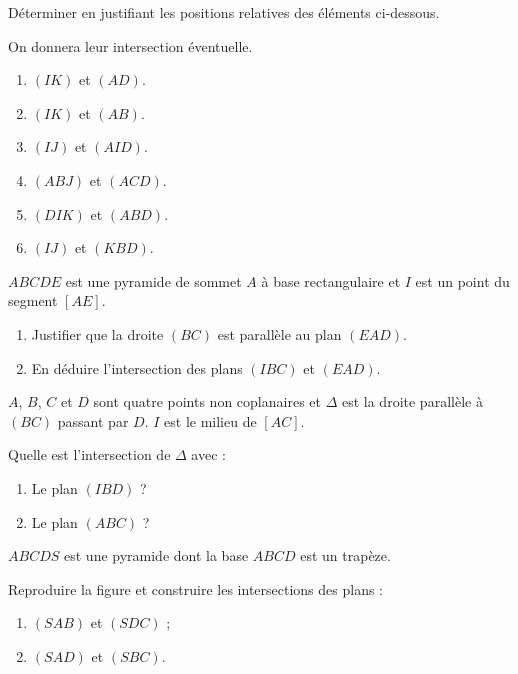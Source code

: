 \documentclass{cornouaille}
\begin{document}
\begin{colonne*exercice}
\begin{exercice}
  Déterminer en justifiant les positions relatives des éléments
  ci-dessous. 

  On donnera leur intersection éventuelle.
  \begin{enumerate}
  \item $(IK)$ et $(AD)$.
  \item $(IK)$ et $(AB)$.
  \item $(IJ)$ et $(AID)$.
  \item $(ABJ)$ et $(ACD)$.
  \item $(DIK)$ et $(ABD)$.
  \item $(IJ)$ et $(KBD)$.
  \end{enumerate}
\end{exercice}

\begin{exercice}
  $ABCDE$ est une pyramide de sommet $A$ à base rectangulaire et $I$
  est un point du segment $[AE]$.
  \begin{enumerate}
  \item Justifier que la droite $(BC)$ est parallèle au plan $(EAD)$.
  \item En déduire l'intersection des plans $(IBC)$ et $(EAD)$.
  \end{enumerate}
\end{exercice}

\begin{exercice}
  $A$, $B$, $C$ et $D$ sont quatre points non coplanaires et $\Delta$
  est la droite parallèle à $(BC)$ passant par $D$. $I$ est le milieu
  de $[AC]$.

  Quelle est l'intersection de $\Delta$ avec :
  \begin{enumerate}
  \item Le plan $(IBD)$ ?
  \item Le plan $(ABC)$ ?
  \end{enumerate}
\end{exercice}

\pagebreak

\begin{exercice}
  $ABCDS$ est une pyramide dont la base $ABCD$ est un trapèze.

  \begin{center}
    
  \end{center}

  Reproduire la figure et construire les intersections des plans :
  \begin{enumerate}
  \item $(SAB)$ et $(SDC)$ ;
  \item $(SAD)$ et $(SBC)$.
  \end{enumerate}
\end{exercice}
 

\end{colonne*exercice}
\end{document}
